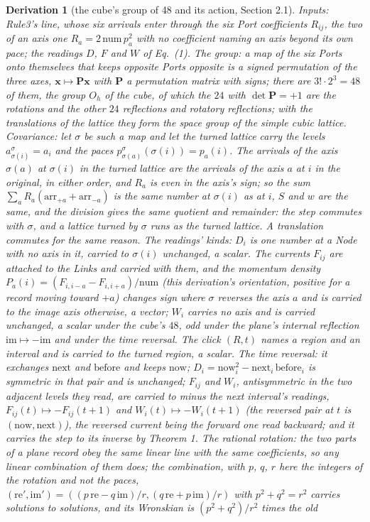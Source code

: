 \documentclass[pdflatex,sn-mathphys-num]{sn-jnl}
\newcommand{\num}{\mathrm{num}}
\theoremstyle{thmstyleone}
\newtheorem{derivation}{Derivation}
\begin{document}
\begin{derivation}[the cube's group of 48 and its action, Section 2.1]
\emph{Inputs:} Rule3's line, whose six arrivals enter through the six Port coefficients $R_{ij}$, the two of an axis one $R_a = 2\,\num\,p_a^2$ with no coefficient naming an axis beyond its own pace; the readings $D$, $F$ and $W$ of Eq.~(1). \emph{The group:} a map of the six Ports onto themselves that keeps opposite Ports opposite is a signed permutation of the three axes, $\mathbf x \mapsto \mathbf P\mathbf x$ with $\mathbf P$ a permutation matrix with signs; there are $3! \cdot 2^3 = 48$ of them, the group $O_h$ of the cube, of which the $24$ with $\det\mathbf P = +1$ are the rotations and the other $24$ reflections and rotatory reflections; with the translations of the lattice they form the space group of the simple cubic lattice. \emph{Covariance:} let $\sigma$ be such a map and let the turned lattice carry the levels $a^\sigma_{\sigma(i)} = a_i$ and the paces $p^\sigma_{\sigma(a)}(\sigma(i)) = p_a(i)$. The arrivals of the axis $\sigma(a)$ at $\sigma(i)$ in the turned lattice are the arrivals of the axis $a$ at $i$ in the original, in either order, and $R_a$ is even in the axis's sign; so the sum $\sum_a R_a(\mathrm{arr}_{+a} + \mathrm{arr}_{-a})$ is the same number at $\sigma(i)$ as at $i$, $S$ and $w$ are the same, and the division gives the same quotient and remainder: the step commutes with $\sigma$, and a lattice turned by $\sigma$ runs as the turned lattice. A translation commutes for the same reason. \emph{The readings' kinds:} $D_i$ is one number at a Node with no axis in it, carried to $\sigma(i)$ unchanged, a scalar. The currents $F_{ij}$ are attached to the Links and carried with them, and the momentum density $P_a(i) = (F_{i, i-a} - F_{i, i+a}) / \num$ (this derivation's orientation, positive for a record moving toward $+a$) changes sign where $\sigma$ reverses the axis $a$ and is carried to the image axis otherwise, a vector; $W_i$ carries no axis and is carried unchanged, a scalar under the cube's $48$, odd under the plane's internal reflection $\mathrm{im} \mapsto -\mathrm{im}$ and under the time reversal. The click $(R, t)$ names a region and an interval and is carried to the turned region, a scalar. \emph{The time reversal:} it exchanges $\mathrm{next}$ and $\mathrm{before}$ and keeps $\mathrm{now}$; $D_i = \mathrm{now}_i^2 - \mathrm{next}_i\,\mathrm{before}_i$ is symmetric in that pair and is unchanged; $F_{ij}$ and $W_i$, antisymmetric in the two adjacent levels they read, are carried to minus the next interval's readings, $F_{ij}(t) \mapsto -F_{ij}(t + 1)$ and $W_i(t) \mapsto -W_i(t + 1)$ (the reversed pair at $t$ is $(\mathrm{now}, \mathrm{next})$), the reversed current being the forward one read backward; and it carries the step to its inverse by Theorem 1. \emph{The rational rotation:} the two parts of a plane record obey the same linear line with the same coefficients, so any linear combination of them does; the combination, with $p$, $q$, $r$ here the integers of the rotation and not the paces, $(\mathrm{re}', \mathrm{im}') = ((p\,\mathrm{re} - q\,\mathrm{im}) / r, (q\,\mathrm{re} + p\,\mathrm{im}) / r)$ with $p^2 + q^2 = r^2$ carries solutions to solutions, and its Wronskian is $(p^2 + q^2) / r^2$ times the old 
\end{derivation}
\end{document}
